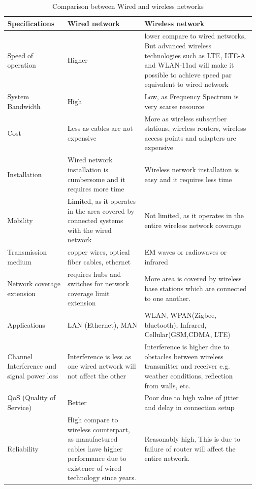 \begin{table}
\caption{Comparison between Wired and wireless networks}
\begin{center}

\begin{tabular}{p{}p{}p{}}
\hline
Specifications       & Wired network    & Wireless network       \\ \hline
Speed of operation   & Higher           & lower compare to wired networks, But advanced wireless technologies such as LTE, LTE-A and WLAN-11ad will make it possible to achieve speed par equivalent to wired network \\
System Bandwidth     & High              & Low, as Frequency Spectrum is very scarse resource    \\
Cost                 & Less as cables are not expensive      & More as wireless subscriber stations, wireless routers, wireless access points and adapters are expensive                 \\
Installation         & Wired network installation is cumbersome and it requires more time   & Wireless network installation is easy and it requires less time             \\
Mobility            & Limited, as it operates in the area covered by connected systems with the wired network                & Not limited, as it operates in the entire wireless network coverage         \\
Transmission medium     & copper wires, optical fiber cables, ethernet   & EM waves or radiowaves or infrared  \\
Network coverage extension    & requires hubs and switches for network coverage limit extension  & More area is covered by wireless base stations which are connected to one another.    \\
Applications           & LAN (Ethernet), MAN        & WLAN, WPAN(Zigbee, bluetooth), Infrared, Cellular(GSM,CDMA, LTE) \\
Channel Interference and signal power loss & Interference is less as one wired network will not affect the other                          & Interference is higher due to obstacles between wireless transmitter and receiver e.g. weather conditions, reflection from walls, etc.                                      \\
QoS (Quality of Service)                   & Better           & Poor due to high value of jitter and delay in connection setup  \\
Reliability           & High compare to wireless counterpart, as manufactured cables have higher performance due to existence of wired technology since years. & Reasonably high, This is due to failure of router will affect the entire network.    \\ \hline
\end{tabular}

    \end{center}
\label{tab3}
\end{table}

